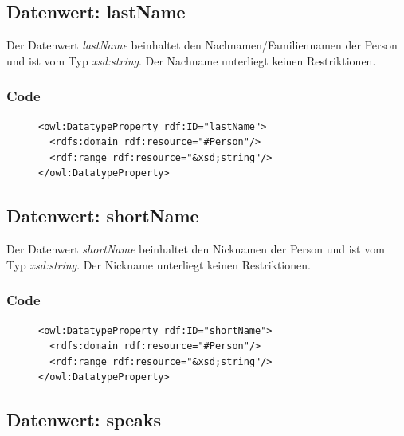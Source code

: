 \documentclass[
    11pt,
    latin1,
    a4paper,
    oneside
]{scrreprt}
\begin{document}
\subsection{Datenwert: lastName} \label{sec:data_lastname}

Der Datenwert \emph{lastName} beinhaltet den Nachnamen/Familiennamen der Person und ist vom Typ \emph{xsd:string}. Der Nachname unterliegt keinen Restriktionen.

\subsubsection{Code} \label{sec:data_lastname_code}

\begin{figure}[H]
 \lstset{language=XML}
 \begin{lstlisting}[label=owl:lastname,caption={Der Datenwert \emph{lastName} gibt den Nachnamen einer Person an.}]
<owl:DatatypeProperty rdf:ID="lastName">
  <rdfs:domain rdf:resource="#Person"/>
  <rdf:range rdf:resource="&xsd;string"/>
</owl:DatatypeProperty>
 \end{lstlisting}
\end{figure}


\subsection{Datenwert: shortName} \label{sec:data_shortname}

Der Datenwert \emph{shortName} beinhaltet den Nicknamen der Person und ist vom Typ \emph{xsd:string}. Der Nickname unterliegt keinen Restriktionen.

\subsubsection{Code} \label{sec:data_shortname_code}

\begin{figure}[H]
 \lstset{language=XML}
 \begin{lstlisting}[label=owl:shortname,caption={Der Datenwert \emph{shortName} gibt den Nicknamen einer Person an.}]
<owl:DatatypeProperty rdf:ID="shortName">
  <rdfs:domain rdf:resource="#Person"/>
  <rdf:range rdf:resource="&xsd;string"/>
</owl:DatatypeProperty>
 \end{lstlisting}
\end{figure}


\subsection{Datenwert: speaks} \label{sec:data_speaks}
\end{document}
